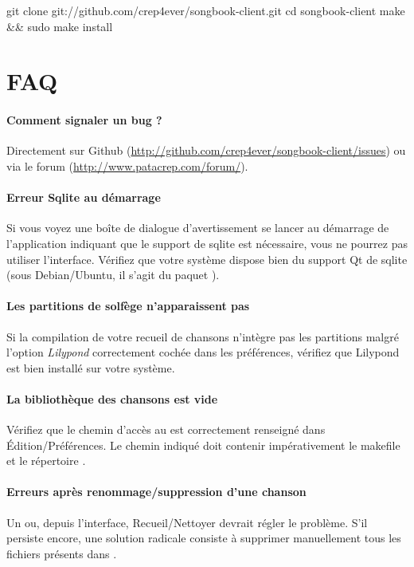\begin{unix}
  git clone git://github.com/crep4ever/songbook-client.git
  cd songbook-client
  make && sudo make install
\end{unix}

\subsection{\windows}


\section{FAQ}

\paragraph{Comment signaler un bug ?}
Directement sur Github
(\url{http://github.com/crep4ever/songbook-client/issues}) ou via le
forum (\url{http://www.patacrep.com/forum/}).

\paragraph{Erreur Sqlite au démarrage} 
Si vous voyez une boîte de dialogue d'avertissement se lancer au
démarrage de l'application indiquant que le support de sqlite est
nécessaire, vous ne pourrez pas utiliser l'interface. Vérifiez que
votre système dispose bien du support Qt de sqlite (sous
Debian/Ubuntu, il s'agit du paquet ).

\paragraph{Les partitions de solfège n'apparaissent pas}
Si la compilation de votre recueil de chansons n'intègre pas les
partitions malgré l'option \emph{Lilypond} correctement cochée dans les
préférences, vérifiez que Lilypond est bien installé sur votre système. 

\paragraph{La bibliothèque des chansons est vide} 
Vérifiez que le chemin d'accès au \recueil{} est correctement
renseigné dans Édition/Préférences. Le chemin indiqué doit contenir
impérativement le makefile et le répertoire .

\paragraph{Erreurs après renommage/suppression d'une chanson} 
Un  ou, depuis l'interface, Recueil/Nettoyer devrait
régler le problème. S'il persiste encore, une solution radicale
consiste à supprimer manuellement tous les fichiers  présents
dans .
